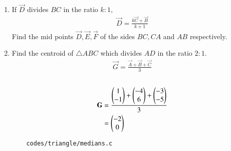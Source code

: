 \begin{enumerate}[label=\thesubsection.\arabic*.,ref=\thesubsection.\theenumi]
\item If $\vec{D}$ divides $BC$ in the ratio $k : 1$,
		\begin{align}
			\vec{D}= \frac{k\vec{C}+\vec{B}}{k+1}
	  \label{eq:app-section_formula}
		\end{align}
		Find the mid points $\vec{D}, \vec{E}, \vec{F}$ of the sides $BC, CA$ and $AB$ respectively.
	\\
		  
	\item Find the centroid  of $\triangle ABC$ which divides $AD$ in the ratio $2:1$.
		\begin{align}
			\vec{G}=\frac{\vec{A}+\vec{B}+\vec{C}}{3}
		\end{align}
   \\
\solution
\begin{equation}
\begin{split}
\label{eq:centroid}
    \mathbf{G}&= \frac{\begin{pmatrix}1\\-1\end{pmatrix}+\begin{pmatrix}-4\\6\end{pmatrix}+\begin{pmatrix}-3\\-5\end{pmatrix}}{3}\\    
     &= \begin{pmatrix}-2\\0\end{pmatrix}
\end{split}
\end{equation}
\begin{lstlisting}
	codes/triangle/medians.c
\end{lstlisting}
\end{enumerate}
